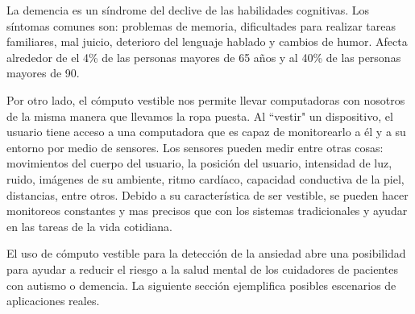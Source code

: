 \documentclass[letterpaper,12pt]{cicese}
\begin{document}
La demencia es un s\'indrome del declive de las habilidades cognitivas. Los s\'intomas comunes son: problemas de memoria, dificultades para realizar tareas familiares, mal juicio, deterioro del lenguaje hablado y cambios de humor\citep{Aziz}. Afecta alrededor de el 4\% de las personas mayores de 65 a\~nos y al 40\% de las personas mayores de 90. 

			Por otro lado, el c\'omputo vestible nos permite llevar computadoras con nosotros de la misma manera que llevamos la ropa puesta. Al ``vestir" un dispositivo,
			el usuario tiene acceso a una computadora que es capaz de monitorearlo a \'el y a su entorno por medio de sensores. Los sensores pueden medir entre
			otras cosas: movimientos del cuerpo del usuario, la posici\'on del usuario, intensidad de luz, ruido, im\'agenes de su ambiente, ritmo card\'iaco, capacidad
			conductiva de la piel, distancias, entre otros. Debido a su caracter\'istica de ser vestible, se pueden hacer monitoreos constantes y mas precisos que con
			los sistemas tradicionales y ayudar en las tareas de la vida cotidiana.
	
			El uso de c\'omputo vestible para la detecci\'on de la ansiedad abre una posibilidad para ayudar a reducir el riesgo a la salud mental
			de los cuidadores de pacientes con autismo o demencia. La siguiente secci\'on ejemplifica posibles escenarios de aplicaciones reales.
\end{document}
